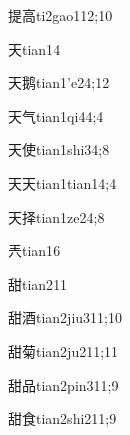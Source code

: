 \begin{verbete}{提高}{ti2gao1}{12;10}
\end{verbete}

\begin{verbete}{天}{tian1}{4}
\end{verbete}

\begin{verbete}{天鹅}{tian1'e2}{4;12}
\end{verbete}

\begin{verbete}{天气}{tian1qi4}{4;4}
\end{verbete}

\begin{verbete}{天使}{tian1shi3}{4;8}
\end{verbete}

\begin{verbete}{天天}{tian1tian1}{4;4}
\end{verbete}

\begin{verbete}{天择}{tian1ze2}{4;8}
\end{verbete}

\begin{verbete}{兲}{tian1}{6}
\end{verbete}

\begin{verbete}{甜}{tian2}{11}
\end{verbete}

\begin{verbete}{甜酒}{tian2jiu3}{11;10}
\end{verbete}

\begin{verbete}{甜菊}{tian2ju2}{11;11}
\end{verbete}

\begin{verbete}{甜品}{tian2pin3}{11;9}
\end{verbete}

\begin{verbete}{甜食}{tian2shi2}{11;9}
\end{verbete}

